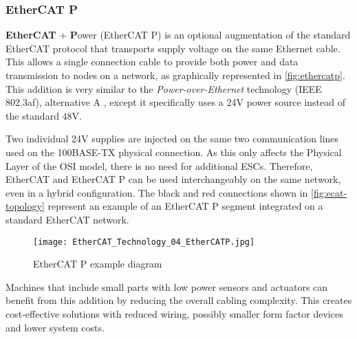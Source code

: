 \subsubsection{EtherCAT P}

\textbf{EtherCAT} + \textbf Power (EtherCAT P) is an optional augmentation of the standard EtherCAT protocol that transports supply voltage on the same Ethernet cable.
This allows a single connection cable to provide both power and data transmission to nodes on a network, as graphically represented in \autoref{fig:ethercatp}.
This addition is very similar to the \emph{Power-over-Ethernet} technology (IEEE 802.3af), alternative A \cite{technology:poe}, except it specifically uses a 24V power source instead of the standard 48V.

Two individual 24V supplies are injected on the same two communication lines used on the 100BASE-TX \cite{technology:poe} physical connection.
As this only affects the Physical Layer of the OSI model, there is no need for additional ESCs.
Therefore, EtherCAT and EtherCAT P can be used interchangeably on the same network, even in a hybrid configuration.
The black and red connections shown in \autoref{fig:ecat-topology} represent an example of an EtherCAT P segment integrated on a standard EtherCAT network.

\begin{figure}[htp]
	\centering
	\texttt{[image: EtherCAT\_Technology\_04\_EtherCATP.jpg]}
	\caption{EtherCAT P example diagram \cite{protocol:ethercat}}
	\label{fig:ethercatp}
\end{figure}

Machines that include small parts with low power sensors and actuators can benefit from this addition by reducing the overall cabling complexity.
This creates cost-effective solutions with reduced wiring, possibly smaller form factor devices and lower system costs.
